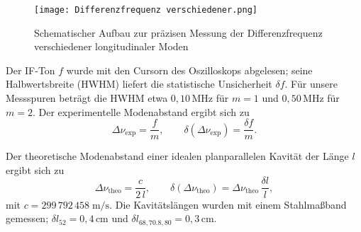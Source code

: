 \begin{figure}[htbp]
    \centering
    \texttt{[image: Differenzfrequenz verschiedener.png]}
     \caption{Schematischer Aufbau zur präzisen Messung der Differenzfrequenz verschiedener longitudinaler Moden \cite{praktikum}}
    \label{fig:difffreq}
  \end{figure}

Der IF-Ton $f$ wurde mit den Cursorn des Oszilloskops abgelesen; seine Halbwertsbreite (HWHM) liefert die statistische Unsicherheit $\delta f$. 
Für unsere Messspuren beträgt die HWHM etwa $0{,}10\,\mathrm{MHz}$ für $m=1$ und $0{,}50\,\mathrm{MHz}$ für $m=2$. 
Der experimentelle Modenabstand ergibt sich zu
\begin{equation}
  \Delta\nu_{\mathrm{exp}} = \frac{f}{m}, 
  \qquad
  \delta(\Delta\nu_{\mathrm{exp}}) = \frac{\delta f}{m}.
\end{equation}

Der theoretische Modenabstand einer idealen planparallelen Kavität der Länge $l$ ergibt sich zu
\begin{equation}
  \Delta\nu_{\mathrm{theo}} = \frac{c}{2\,l}, 
  \qquad
  \delta(\Delta\nu_{\mathrm{theo}}) = \Delta\nu_{\mathrm{theo}}\,\frac{\delta l}{l},
\end{equation}
mit $c = 299\,792\,458\;\mathrm{m/s}$. 
Die Kavitätslängen wurden mit einem Stahlmaßband gemessen; $\delta l_{52} = 0{,}4\,\mathrm{cm}$ und $\delta l_{68,70.8,80} = 0{,}3\,\mathrm{cm}$.

\begin{table}[H]
  \centering
  \caption{Beats von $m=1$ und $m=2$ Moden: experimentelle und theoretische Modenabstände für verschiedene interne Kavitätenlängen.}
  \label{tab:beat-data}
\end{table}

